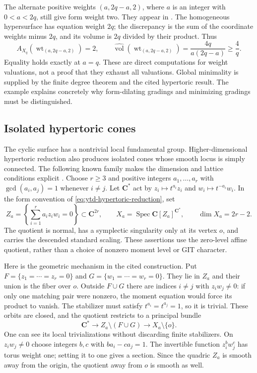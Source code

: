 The alternate positive weights $(a,2q-a,2)$, where $a$ is an integer
with $0<a<2q$, still give form weight two. They appear in
\cite[Remark~5.9]{Namikawa25HypertoricCharacterizationV5}.
The homogeneous hypersurface has equation weight $2q$;
the discrepancy is the sum of the coordinate weights minus $2q$,
and its volume is $2q$ divided by their product. Thus
\[
\tag{68.23cc}\label{eq:ytd-cyclic-alternate-grading}
 A_{X_q}(\operatorname{wt}_{(a,2q-a,2)})=2,
 \qquad
 \widehat{\operatorname{vol}}
       (\operatorname{wt}_{(a,2q-a,2)})
       =\frac{4q}{a(2q-a)}\geq\frac4q.
\]
Equality holds exactly at $a=q$. These are direct computations
for weight valuations, not a proof that they exhaust all valuations.
Global minimality is supplied by the finite degree theorem and
the cited hypertoric result. The example explains concretely why
form-dilating gradings and minimizing gradings must be distinguished.

\subsection{Isolated hypertoric cones}
\label{sec:ytd-local-isolated-hypertoric}

The cyclic surface has a nontrivial local fundamental group.
Higher-dimensional hypertoric reduction also produces isolated
cones whose smooth locus is simply connected. The following
known family makes the dimension and lattice conditions explicit
\cite[Proposition~1, Claims~2--3]{Namikawa25IsolatedHypertoricV3}.
Choose $r\geq3$ and positive integers $a_1,\ldots,a_r$ with
$\gcd(a_i,a_j)=1$ whenever $i\ne j$. Let $\mathbf C^*$ act by
$z_i\mapsto t^{a_i}z_i$ and $w_i\mapsto t^{-a_i}w_i$.
In the form convention of \eqref{eq:ytd-hypertoric-reduction}, set
\[
\tag{68.23cd}\label{eq:ytd-isolated-hypertoric-cone}
 Z_a=\left\{\sum_{i=1}^r a_i z_iw_i=0\right\}
       \subset\mathbf C^{2r},\qquad
 X_a=\operatorname{Spec}\mathbf C[Z_a]^{\mathbf C^*},
 \qquad \dim X_a=2r-2.
\]
The quotient is normal, has a symplectic singularity only at its
vertex $o$, and carries the descended standard scaling. These
assertions use the zero-level affine quotient, rather than a
choice of nonzero moment level or GIT character.

Here is the geometric mechanism in the cited construction.
Put $F=\{z_1=\cdots=z_r=0\}$ and
$G=\{w_1=\cdots=w_r=0\}$. They lie in $Z_a$ and their union
is the fiber over $o$. Outside $F\cup G$ there are indices
$i\ne j$ with $z_iw_j\ne0$: if only one matching pair were
nonzero, the moment equation would force its product to vanish.
The stabilizer must satisfy $t^{a_i}=t^{a_j}=1$, so it is trivial.
These orbits are closed, and the quotient restricts to a principal
bundle
\[
\tag{68.23ce}\label{eq:ytd-isolated-hypertoric-bundle}
 \mathbf C^*\longrightarrow Z_a\setminus(F\cup G)
       \longrightarrow X_a\setminus\{o\}.
\]
One can see its local trivializations without discarding finite
stabilizers. On $z_iw_j\ne0$ choose integers $b,c$ with
$ba_i-ca_j=1$. The invertible function $z_i^bw_j^c$ has
torus weight one; setting it to one gives a section. Since the
quadric $Z_a$ is smooth away from the origin, the quotient away
from $o$ is smooth as well.

